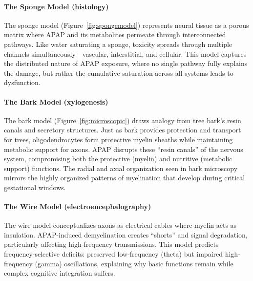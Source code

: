 \documentclass[12pt]{article}
\begin{document}
\paragraph{The Sponge Model (histology)}
The sponge model (Figure~\ref{fig:spongemodel}) represents neural tissue as a porous matrix where APAP and its metabolites permeate through interconnected pathways. Like water saturating a sponge, toxicity spreads through multiple channels simultaneously—vascular, interstitial, and cellular. This model captures the distributed nature of APAP exposure, where no single pathway fully explains the damage, but rather the cumulative saturation across all systems leads to dysfunction.

\paragraph{The Bark Model (xylogenesis)}
The bark model (Figure~\ref{fig:microscopic}) draws analogy from tree bark's resin canals and secretory structures. Just as bark provides protection and transport for trees, oligodendrocytes form protective myelin sheaths while maintaining metabolic support for axons. APAP disrupts these ``resin canals'' of the nervous system, compromising both the protective (myelin) and nutritive (metabolic support) functions. The radial and axial organization seen in bark microscopy mirrors the highly organized patterns of myelination that develop during critical gestational windows.

\paragraph{The Wire Model (electroencephalography)}
The wire model conceptualizes axons as electrical cables where myelin acts as insulation. APAP-induced demyelination creates ``shorts'' and signal degradation, particularly affecting high-frequency transmissions. This model predicts frequency-selective deficits: preserved low-frequency (theta) but impaired high-frequency (gamma) oscillations, explaining why basic functions remain while complex cognitive integration suffers.
\end{document}
